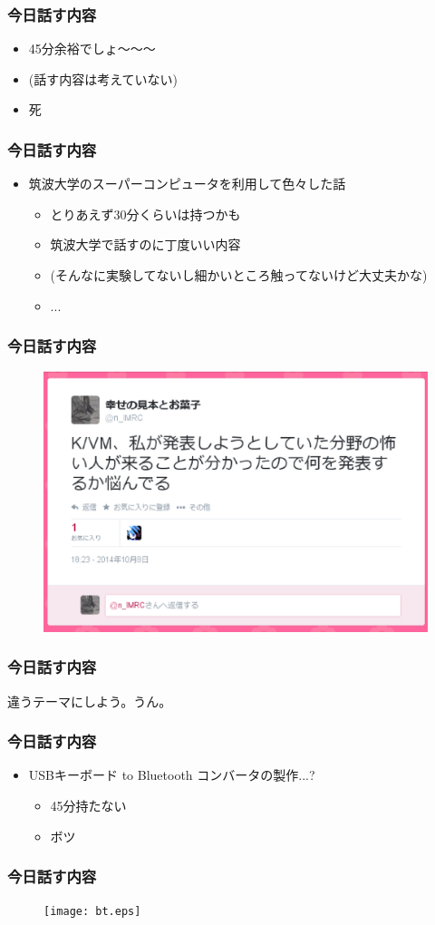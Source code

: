 \documentclass[dvipdfmx,20pt,notheorems,t]{beamer}
\begin{document}
\begin{frame}\frametitle{今日話す内容}
\begin{itemize}
\item 45分余裕でしょ〜〜〜
\item (話す内容は考えていない)
\item 死
\end{itemize}
\end{frame}
\begin{frame}\frametitle{今日話す内容}
\begin{itemize}
\item 筑波大学のスーパーコンピュータを利用して色々した話
\begin{itemize}
\item とりあえず30分くらいは持つかも
\item 筑波大学で話すのに丁度いい内容
\item (そんなに実験してないし細かいところ触ってないけど大丈夫かな)
\item ...
\end{itemize}
\end{itemize}
\end{frame}
\begin{frame}\frametitle{今日話す内容}
\begin{figure}[htb]
\centering
\includegraphics[width=\textwidth]{1.eps}
\end{figure}
\end{frame}
\begin{frame}\frametitle{今日話す内容}
違うテーマにしよう。うん。
\end{frame}
\begin{frame}\frametitle{今日話す内容}
\begin{itemize}
\item USBキーボード to Bluetooth コンバータの製作...?
\begin{itemize}
\item 45分持たない
\item ボツ
\end{itemize}
\end{itemize}
\end{frame}
\begin{frame}\frametitle{今日話す内容}
\begin{figure}[htb]
\centering
\texttt{[image: bt.eps]}
\end{figure}
\end{frame}
\end{document}

